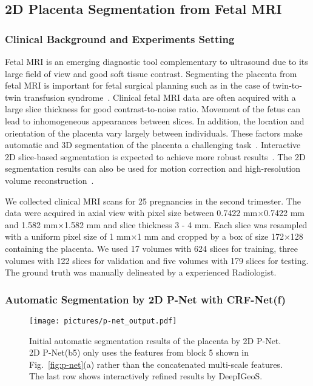 \documentclass[10pt,journal,compsoc]{IEEEtran}
\begin{document}
\subsection{2D Placenta Segmentation from Fetal MRI}
\subsubsection{Clinical Background and Experiments Setting}
Fetal MRI is an emerging diagnostic tool complementary to ultrasound due to its large field of view and good soft tissue contrast. Segmenting the placenta from fetal MRI is important for fetal surgical planning such as in the case of twin-to-twin transfusion syndrome~\cite{Deprest2010}. Clinical fetal MRI data are often acquired with a large slice thickness for good contrast-to-noise ratio. Movement of the fetus can lead to inhomogeneous appearances between slices. In addition, the location and orientation of the placenta vary largely between individuals. These factors make automatic and 3D segmentation of the placenta a challenging task~\cite{Alansary2016}. Interactive 2D slice-based segmentation is expected to achieve more robust results~\cite{Wang2016, Wang2016a}. The 2D segmentation results can also be used for motion correction and high-resolution volume reconstruction~\cite{Keraudren2014}. 


We collected clinical MRI scans for 25 pregnancies in the second trimester. The data were acquired in axial view with pixel size between 0.7422 mm$\times$0.7422 mm and 1.582 mm$\times$1.582 mm and slice thickness 3 - 4 mm. Each slice was resampled with a uniform pixel size of 1 mm$\times$1 mm and cropped by a box of size 172$\times$128 containing the placenta. %
We used 17 volumes with 624 slices for training, three volumes with 122 slices for validation and five volumes with 179 slices for testing. The ground truth was manually delineated by a experienced Radiologist. 


\subsubsection{Automatic Segmentation by 2D P-Net with CRF-Net(f)}
\begin{figure}[t]
	\centering
	\texttt{[image: pictures/p-net\_output.pdf]}
	\caption[Initial automatic segmentation results of the placenta]{ 
		Initial automatic segmentation results of the placenta by 2D P-Net. 2D P-Net(b5) only uses the features from block 5 shown in Fig.~\ref{fig:p-net}(a) rather than the concatenated multi-scale features. The last row shows interactively refined results by DeepIGeoS.} 
	\label{fig:p-net_output}
\end{figure}
\end{document}
